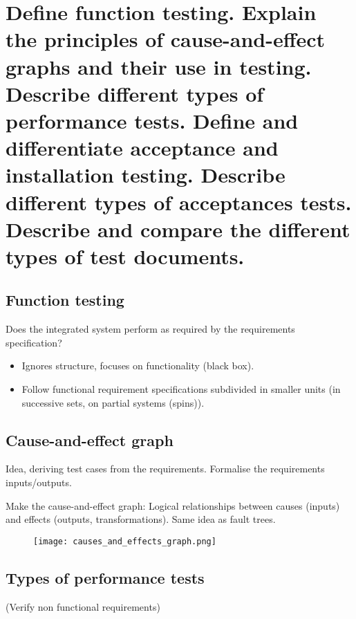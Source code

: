 \clearpage{}
\section{Define function testing. Explain the principles of cause-and-effect
graphs and their use in testing. Describe different types of performance
tests. Define and differentiate acceptance and installation testing.
Describe different types of acceptances tests. Describe and compare the
different types of test documents.}


\subsection{Function testing}

Does the integrated system perform as required by the requirements specification? 
\begin{itemize}

\item Ignores structure, focuses on functionality (black box). 
\item Follow functional requirement specifications subdivided in smaller
    units (in successive sets, on partial systems (spins)).
\end{itemize}

\subsection{Cause-and-effect graph}

Idea, deriving test cases from the requirements. Formalise the
requirements inputs/outputs. \newline

Make the cause-and-effect graph: Logical relationships between causes (inputs) and effects (outputs, transformations). Same idea as fault trees.

\begin{figure}[!ht]
    \centering
    \texttt{[image: causes\_and\_effects\_graph.png]}
\end{figure}

\subsection{Types of performance tests}
(Verify non functional requirements)

